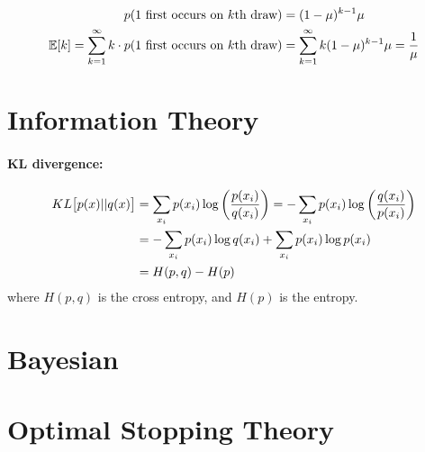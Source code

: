\documentclass[11pt]{article}
\begin{document}
\begin{align}
  p(\textrm{1 first occurs on $k$th draw}) &= (1-\mu)^{k-1} \mu \nonumber\\
  \mathbb{E}[k] = \sum_{k=1}^{\infty} k \cdot p(\textrm{1 first occurs on $k$th draw}) &=
          \sum_{k=1}^{\infty} k (1-\mu)^{k-1} \mu = \frac{1}{\mu}
\end{align}




\section{Information Theory}
\paragraph{KL divergence:}
\begin{align}
  KL\big[p(x) || q(x)\big]
  &= \sum_{x_i} p(x_i) \log \left( \frac{p(x_i)}{q(x_i)} \right)
    = -\sum_{x_i} p(x_i) \log \left( \frac{q(x_i)}{p(x_i)} \right) \nonumber\\ 
  &= -\sum_{x_i} p(x_i) \log q(x_i) + \sum_{x_i} p(x_i) \log p(x_i) \nonumber\\ 
  &= H(p,q) - H(p)
\end{align}
where $H(p,q)$ is the cross entropy, and $H(p)$ is the entropy.



\section{Bayesian}



\section{Optimal Stopping Theory}



\newpage
\printbibliography[heading=bibintoc]

\end{document}
